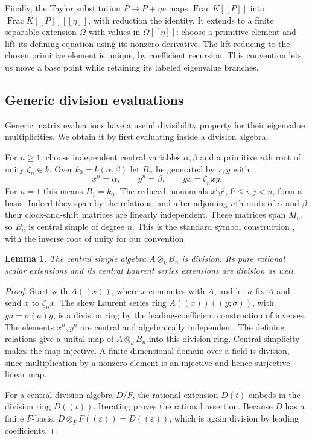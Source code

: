 \documentclass[11pt]{article}
\newtheorem{lemma}[theorem]{Lemma}
\theoremstyle{definition}
\theoremstyle{remark}
\numberwithin{equation}{section}
\begin{document}
Finally, the Taylor substitution $P\mapsto P+\eta v$ maps
$\operatorname{Frac}K[[P]]$ into
$\operatorname{Frac}K[[P]][[\eta]]$, with reduction the identity.
It extends to a finite separable extension $\Omega$ with values in
$\Omega[[\eta]]$: choose a primitive element and lift its defining
equation using its nonzero derivative.  The lift reducing to the
chosen primitive element is unique, by coefficient recursion.  This
convention lets us move a base point while retaining its labeled
eigenvalue branches.

\subsection{Generic division evaluations}\label{subsec:generic-division}

Generic matrix evaluations have a useful divisibility property for
their eigenvalue multiplicities.  We obtain it by first evaluating
inside a division algebra.

For $n\ge1$, choose independent central variables $\alpha,\beta$
and a primitive $n$th root of unity $\zeta_n\in k$.  Over
$k_0=k(\alpha,\beta)$ let $B_n$ be generated by $x,y$ with
\[
 x^n=\alpha,\qquad y^n=\beta,\qquad yx=\zeta_nxy.
\]
For $n=1$ this means $B_1=k_0$.  The reduced monomials
$x^iy^j$, $0\le i,j<n$, form a basis.  Indeed they span by the
relations, and after adjoining $n$th roots of $\alpha$ and $\beta$
their clock-and-shift matrices are linearly independent.  These
matrices span $M_n$, so $B_n$ is central simple of degree $n$.
This is the standard symbol construction
\cite[Corollary~2.5.5(1)]{GilleSzamuely2006}, with the inverse
root of unity for our convention.

\begin{lemma}\label{lem:symbol-division}
The central simple algebra $A\otimes_k B_n$ is division.  Its pure
rational scalar extensions and its central Laurent series extensions
are division as well.
\end{lemma}

\begin{proof}
Start with $A((x))$, where $x$ commutes with $A$, and let $\sigma$
fix $A$ and send $x$ to $\zeta_nx$.  The skew Laurent series ring
$A((x))((y;\sigma))$, with $ya=\sigma(a)y$, is a division ring by
the leading-coefficient construction of inverses.  The elements
$x^n,y^n$ are central and algebraically independent.  The defining
relations give a unital map of $A\otimes_k B_n$ into this division
ring.  Central simplicity makes the map injective.  A finite
dimensional domain over a field is division, since multiplication by
a nonzero element is an injective and hence surjective linear map.

For a central division algebra $D/F$, the rational extension $D(t)$
embeds in the division ring $D((t))$.  Iterating proves the rational
assertion.  Because $D$ has a finite $F$-basis,
$D\otimes_F F((\varepsilon))=D((\varepsilon))$, which is again
division by leading coefficients.
\end{proof}
\end{document}

